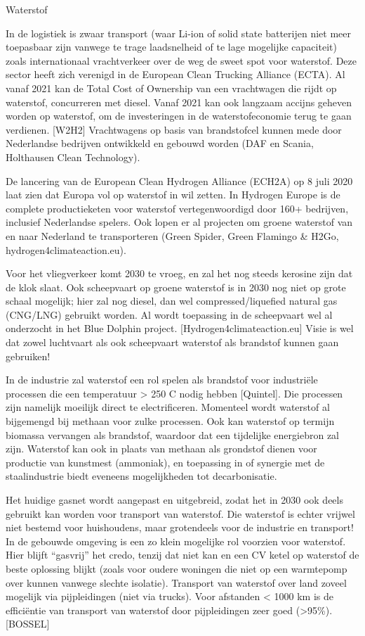 \begin{voorstel}{Waterstof}
\begin{overwegingen}
In de logistiek is zwaar transport (waar Li-ion of solid state batterijen niet meer toepasbaar zijn vanwege te trage laadsnelheid of te lage mogelijke capaciteit) zoals internationaal vrachtverkeer over de weg de sweet spot voor waterstof. Deze sector heeft zich verenigd in de European Clean Trucking Alliance (ECTA). Al vanaf 2021 kan de Total Cost of Ownership van een vrachtwagen die rijdt op waterstof, concurreren met diesel. Vanaf 2021 kan ook langzaam accijns geheven worden op waterstof, om de investeringen in de waterstofeconomie terug te gaan verdienen. [W2H2] Vrachtwagens op basis van brandstofcel kunnen mede door Nederlandse bedrijven ontwikkeld en gebouwd worden (DAF en Scania, Holthausen Clean Technology). 

De lancering van de European Clean Hydrogen Alliance (ECH2A) op 8 juli 2020 laat zien dat Europa vol op waterstof in wil zetten. In Hydrogen Europe is de complete productieketen voor waterstof vertegenwoordigd door 160+ bedrijven, inclusief Nederlandse spelers. Ook lopen er al projecten om groene waterstof van en naar Nederland te transporteren (Green Spider, Green Flamingo \& H2Go, hydrogen4climateaction.eu).

Voor het vliegverkeer komt 2030 te vroeg, en zal het nog steeds kerosine zijn dat de klok slaat. Ook scheepvaart op groene waterstof is in 2030 nog niet op grote schaal mogelijk; hier zal nog diesel, dan wel compressed/liquefied natural gas (CNG/LNG) gebruikt worden. Al wordt toepassing in de scheepvaart wel al onderzocht in het Blue Dolphin project. [Hydrogen4climateaction.eu] Visie is wel dat zowel luchtvaart als ook scheepvaart waterstof als brandstof kunnen gaan gebruiken!

In de industrie zal waterstof een rol spelen als brandstof voor industriële processen die een temperatuur > 250 C nodig hebben [Quintel]. Die processen zijn namelijk moeilijk direct te electrificeren. Momenteel wordt waterstof al bijgemengd bij methaan voor zulke processen. Ook kan waterstof op termijn biomassa vervangen als brandstof, waardoor dat een tijdelijke energiebron zal zijn. Waterstof kan ook in plaats van methaan als grondstof dienen voor productie van kunstmest (ammoniak), en toepassing in of synergie met de staalindustrie biedt eveneens mogelijkheden tot decarbonisatie.

Het huidige gasnet wordt aangepast en uitgebreid, zodat het in 2030 ook deels gebruikt kan worden voor transport van waterstof. Die waterstof is echter vrijwel niet bestemd voor huishoudens, maar grotendeels voor de industrie en transport! In de gebouwde omgeving is een zo klein mogelijke rol voorzien voor waterstof. Hier blijft “gasvrij” het credo, tenzij dat niet kan en een CV ketel op waterstof de beste oplossing blijkt (zoals voor oudere woningen die niet op een warmtepomp over kunnen vanwege slechte isolatie). Transport van waterstof over land zoveel mogelijk via pijpleidingen (niet via trucks). Voor afstanden < 1000 km is de efficiëntie van transport van waterstof door pijpleidingen zeer goed (>95\%). [BOSSEL]


\end{overwegingen}
\end{voorstel}
